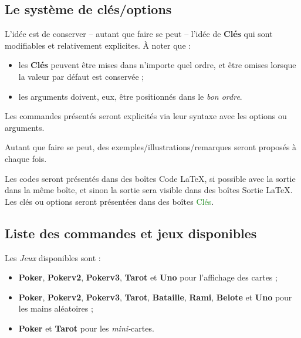 \documentclass{article}
\newcommand\Cle[1]{{\bfseries\sffamily\textlangle #1\textrangle}}
\begin{document}
{{{{{{{\subsection{Le système de \og clés/options \fg}

\begin{codeidee}
L'idée est de conserver -- autant que faire se peut -- l'idée de \Cle{Clés} qui sont modifiables et relativement explicites. À noter que :
%
\begin{itemize}[leftmargin=*]
	\item les \Cle{Clés} peuvent être mises dans n'importe quel ordre, et être omises lorsque la valeur par défaut est conservée ;
	\item les \textsf{arguments} doivent, eux, être positionnés dans le \textit{bon ordre}.
\end{itemize}
\end{codeidee}

\begin{codeinfo}
Les \textsf{commandes} présentés seront explicités via leur \textsf{syntaxe} avec les \textsf{options} ou \textsf{arguments}.

Autant que faire se peut, des exemples/illustrations/remarques seront proposés à chaque fois.

\smallskip

Les \textsf{codes} seront présentés dans des \textsf{boîtes} \textcolor{red!75!black}{{\small \faCode} Code \LaTeX}, si possible avec la \textsf{sortie} dans la même boîte, et sinon la \textsf{sortie} sera visible dans des \textsf{boîtes} \textcolor{red!75!black}{{\small \faArrowAltCircleRight[regular]} Sortie \LaTeX}. Les \textsf{clés} ou \textsf{options} seront présentées dans des \textsf{boîtes} \textcolor{ForestGreen}{{\small \faPaperclip} Clés}.
\end{codeinfo}

\subsection{Liste des commandes et jeux disponibles}

\begin{codeinfo}
Les \textit{Jeux} disponibles sont :

\begin{itemize}
	\item \Cle{Poker}, \Cle{Pokerv2}, \Cle{Pokerv3}, \Cle{Tarot} et \Cle{Uno} pour l'affichage des cartes ;
	\item \Cle{Poker}, \Cle{Pokerv2}, \Cle{Pokerv3}, \Cle{Tarot}, \Cle{Bataille}, \Cle{Rami}, \Cle{Belote} et \Cle{Uno} pour les mains aléatoires ;
	\item \Cle{Poker} et \Cle{Tarot} pour les \textit{mini-}cartes.
\end{itemize}
\end{codeinfo}

}}}}}}}
\end{document}
